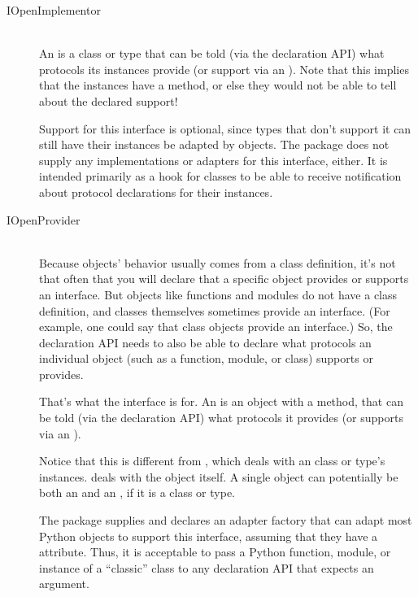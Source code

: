 \begin{verbatim%
}
\begin{verbatim%
}
\begin{verbatim%
}
\begin{verbatim%
}
\begin{verbatim%
}
\begin{verbatim%
}
\begin{description}
\item[IOpenImplementor] \hfill \\
An  is a class or type that can be told (via the
declaration API) what protocols its instances provide (or support via an
).  Note that this implies that the instances have
a  method, or else they would not be able to tell
 about the declared support!

Support for this interface is optional, since types that don't support it
can still have their instances be adapted by  objects.
The  package does not supply any implementations or adapters
for this interface, either.  It is intended primarily as a hook for classes
to be able to receive notification about protocol declarations for their
instances.


\item[IOpenProvider] \hfill \\
Because objects' behavior usually comes from a class definition, it's not that
often that you will declare that a specific object provides or supports an
interface.  But objects like functions and modules do not have a class
definition, and classes themselves sometimes provide an interface.  (For
example, one could say that class objects provide an  interface.)
So, the declaration API needs to also be able to declare what protocols an
individual object (such as a function, module, or class) supports or provides.

That's what the  interface is for.  An
 is an object with a  method, that can
be told (via the declaration API) what protocols it provides (or supports via
an ).

Notice that this is different from , which deals with
an class or type's instances.   deals with the object
itself.  A single object can potentially be both an  and an
, if it is a class or type.

The  package supplies and declares an adapter factory that
can adapt most Python objects to support this interface, assuming that they
have a  attribute.  Thus, it is acceptable to pass a Python
function, module, or instance of a  ``classic'' class to any declaration API
that expects an  argument.


\end{description}
\end{verbatim%
}
\end{verbatim%
}
\end{verbatim%
}
\end{verbatim%
}
\end{verbatim%
}
\end{verbatim%
}
